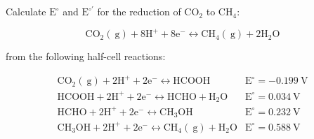 \documentclass[12pt]{article}
\begin{document}
\section{}
\subsection{}

Calculate $\mathrm{E}^{\circ}$ and $\mathrm{E}^{\circ \prime}$ for the reduction of $\mathrm{CO}_{2}$ to $\mathrm{CH}_{4}$:

$$
\mathrm{CO}_{2}(\mathrm{~g})+8 \mathrm{H}^{+}+8 \mathrm{e}^{-} \leftrightarrow \mathrm{CH}_{4}(\mathrm{~g})+2 \mathrm{H}_{2} \mathrm{O}
$$

from the following half-cell reactions:

$$
\begin{array}{ll}
\mathrm{CO}_{2}(\mathrm{~g})+2 \mathrm{H}^{+}+2 \mathrm{e}^{-} \leftrightarrow \mathrm{HCOOH} & \mathrm{E}^{\circ}=-0.199 \mathrm{~V} \\
\mathrm{HCOOH}+2 \mathrm{H}^{+}+2 \mathrm{e}^{-} \leftrightarrow \mathrm{HCHO}+\mathrm{H}_{2} \mathrm{O} & \mathrm{E}^{\circ}=0.034 \mathrm{~V} \\
\mathrm{HCHO}+2 \mathrm{H}^{+}+2 \mathrm{e}^{-} \leftrightarrow \mathrm{CH}_{3} \mathrm{OH} & \mathrm{E}^{\circ}=0.232 \mathrm{~V} \\
\mathrm{CH}_{3} \mathrm{OH}+2 \mathrm{H}^{+}+2 \mathrm{e}^{-} \leftrightarrow \mathrm{CH}_{4}(\mathrm{~g})+\mathrm{H}_{2} \mathrm{O} & \mathrm{E}^{\circ}=0.588 \mathrm{~V}
\end{array}
$$
\end{document}
